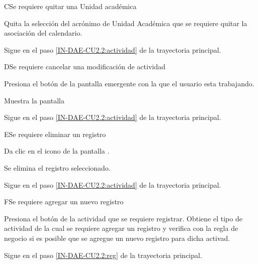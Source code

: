 \begin{UCtrayectoriaA}{C}{Se requiere quitar una Unidad académica}
	
	\UCpaso [\UCactor] 	Quita la selección del acrónimo de Unidad Académica que se requiere quitar la asociación del calendario. 
	
	\UCpaso Sigue en el paso \ref{IN-DAE-CU2.2:actividad}  de la trayectoria principal.
	
\end{UCtrayectoriaA}

\begin{UCtrayectoriaA}{D}{Se requiere cancelar una modificación de actividad}
	
	\UCpaso [\UCactor] 	Presiona el botón  de la pantalla emergente con la que el usuario esta trabajando.
	
	\UCpaso Muestra la pantalla  
	
	\UCpaso Sigue en el paso \ref{IN-DAE-CU2.2:actividad} de la trayectoria principal.
	
\end{UCtrayectoriaA}


\begin{UCtrayectoriaA}{E}{Se requiere eliminar un registro}
	
	\UCpaso [\UCactor] 	Da clic en el icono \IURechazar de la pantalla  .
	
	\UCpaso Se elimina el registro seleccionado.
	
	\UCpaso Sigue en el paso \ref{IN-DAE-CU2.2:actividad}  de la trayectoria principal.
	
\end{UCtrayectoriaA}


\begin{UCtrayectoriaA}{F}{Se requiere agregar un nuevo registro }
	
	\UCpaso [\UCactor] Presiona el botón  de la actividad que se requiere registrar.
	\UCpaso Obtiene el tipo de actividad de la cual se requiere agregar un registro y verifica con la regla de negocio  si es posible que se agregue un nuevo registro para dicha activad.
	
	\UCpaso Sigue en el paso \ref{IN-DAE-CU2.2:reg}  de la trayectoria principal. 
	
\end{UCtrayectoriaA}

